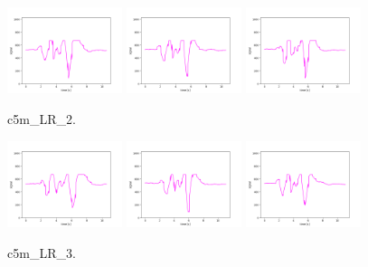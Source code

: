 \begin{figure}[!ht]
\begin{center}
\includegraphics[width=0.3\textwidth]{../data/c5m_LR_2/c5m_LR_2_1.png}
\includegraphics[width=0.3\textwidth]{../data/c5m_LR_2/c5m_LR_2_2.png}
\includegraphics[width=0.3\textwidth]{../data/c5m_LR_2/c5m_LR_2_3.png}
\caption{c5m\_LR\_2.\label{fig:c5m_LR_2}}
\end{center}
\end{figure}

\begin{figure}[!ht]
\begin{center}
\includegraphics[width=0.3\textwidth]{../data/c5m_LR_3/c5m_LR_3_1.png}
\includegraphics[width=0.3\textwidth]{../data/c5m_LR_3/c5m_LR_3_2.png}
\includegraphics[width=0.3\textwidth]{../data/c5m_LR_3/c5m_LR_3_3.png}
\caption{c5m\_LR\_3.\label{fig:c5m_LR_3}}
\end{center}
\end{figure}

